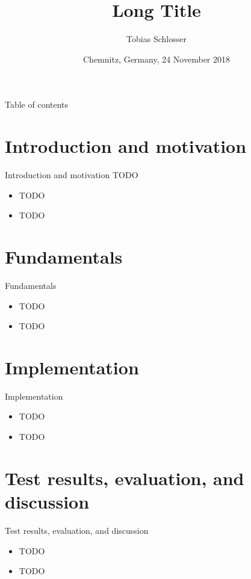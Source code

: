\documentclass[xcolor=dvipsnames]{beamer}
\title[Short Title]{\normalsize Long Title}
\author[T. Schlosser]{\footnotesize Tobias Schlosser}
\institute{%
	Junior Professorship of Media Computing, \\
	Chemnitz University of Technology, 09107 Chemnitz, Germany, \\
	\texttt{\tiny \{firstname.lastname\}@cs.tu-chemnitz.de}
}
\date{\footnotesize Chemnitz, Germany, 24 November 2018}
\begin{document}
\begin{frame}
	\titlepage
\end{frame}

\begin{frame}{Table of contents}
	\tableofcontents[hideallsubsections]
\end{frame}




\section{Introduction and motivation}

\begin{frame}{Introduction and motivation}
	TODO \cite{Schlosser2018}

	\begin{itemize}
		\item TODO
		\item TODO
	\end{itemize}
\end{frame}


\section{Fundamentals}

\begin{frame}{Fundamentals}
	\begin{itemize}
		\item TODO
		\item TODO
	\end{itemize}
\end{frame}


\section{Implementation}

\begin{frame}{Implementation}
	\begin{itemize}
		\item TODO
		\item TODO
	\end{itemize}
\end{frame}


\section{Test results, evaluation, and discussion}

\begin{frame}{Test results, evaluation, and discussion}
	\begin{itemize}
		\item TODO
		\item TODO
	\end{itemize}
\end{frame}
\end{document}
